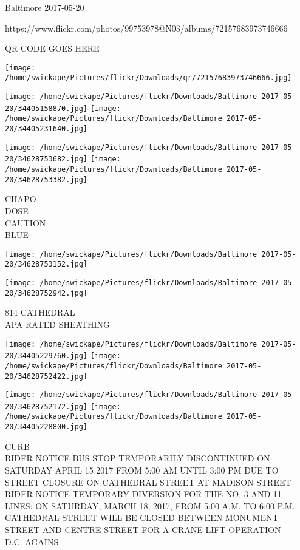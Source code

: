 \documentclass[10pt,letterpaper]{article}
\begin{document}
Baltimore 2017-05-20

https://www.flickr.com/photos/99753978@N03/albums/72157683973746666

QR CODE GOES HERE

\texttt{[image: /home/swickape/Pictures/flickr/Downloads/qr/72157683973746666.jpg]}
\pagebreak

\texttt{[image: /home/swickape/Pictures/flickr/Downloads/Baltimore 2017-05-20/34405158870.jpg]}
\texttt{[image: /home/swickape/Pictures/flickr/Downloads/Baltimore 2017-05-20/34405231640.jpg]}

\texttt{[image: /home/swickape/Pictures/flickr/Downloads/Baltimore 2017-05-20/34628753682.jpg]}
\texttt{[image: /home/swickape/Pictures/flickr/Downloads/Baltimore 2017-05-20/34628753382.jpg]}

CHAPO\\
DOSE\\
CAUTION\\
BLUE\\
\pagebreak

\texttt{[image: /home/swickape/Pictures/flickr/Downloads/Baltimore 2017-05-20/34628753152.jpg]}

\vspace{0.25in}
\texttt{[image: /home/swickape/Pictures/flickr/Downloads/Baltimore 2017-05-20/34628752942.jpg]}

814 CATHEDRAL\\
APA RATED SHEATHING\\
\pagebreak

\texttt{[image: /home/swickape/Pictures/flickr/Downloads/Baltimore 2017-05-20/34405229760.jpg]}
\texttt{[image: /home/swickape/Pictures/flickr/Downloads/Baltimore 2017-05-20/34628752422.jpg]}

\texttt{[image: /home/swickape/Pictures/flickr/Downloads/Baltimore 2017-05-20/34628752172.jpg]}
\texttt{[image: /home/swickape/Pictures/flickr/Downloads/Baltimore 2017-05-20/34405228800.jpg]}

CURB\\
RIDER NOTICE BUS STOP TEMPORARILY DISCONTINUED ON SATURDAY APRIL 15 2017 FROM 5:00 AM UNTIL 3:00 PM DUE TO STREET CLOSURE ON CATHEDRAL STREET AT MADISON STREET\\
RIDER NOTICE TEMPORARY DIVERSION FOR THE NO. 3 AND 11 LINES: ON SATURDAY, MARCH 18, 2017, FROM 5:00 A.M. TO 6:00 P.M. CATHEDRAL STREET WILL BE CLOSED BETWEEN MONUMENT STREET AND CENTRE STREET FOR A CRANE LIFT OPERATION\\
D.C. AGAINS\\
\pagebreak
\end{document}
